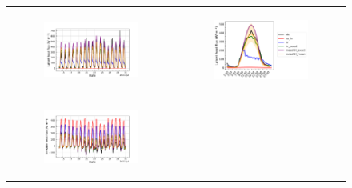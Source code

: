 \begin{figure}[hbtp]
    \centering
    \begin{tabular}{cc}
        \begin{subfigure}[t]{0.5\textwidth}
            \caption{}
            \includegraphics[width=\textwidth]{images/chap5/SOP_TS_DC/time_series_cendrosa_flat.png}
        \end{subfigure} &
        \begin{subfigure}[t]{0.5\textwidth}
            \caption{}
            \includegraphics[width=\textwidth]{images/chap5/SOP_TS_DC/diurnal_cycle_cendrosa_flat.png}
        \end{subfigure} \\
        \begin{subfigure}[t]{0.5\textwidth}
            \caption{}
            \includegraphics[width=\textwidth]{images/chap5/SOP_TS_DC/time_series_cendrosa_sens.png}

\end{subfigure}
\end{tabular}
\end{figure}
